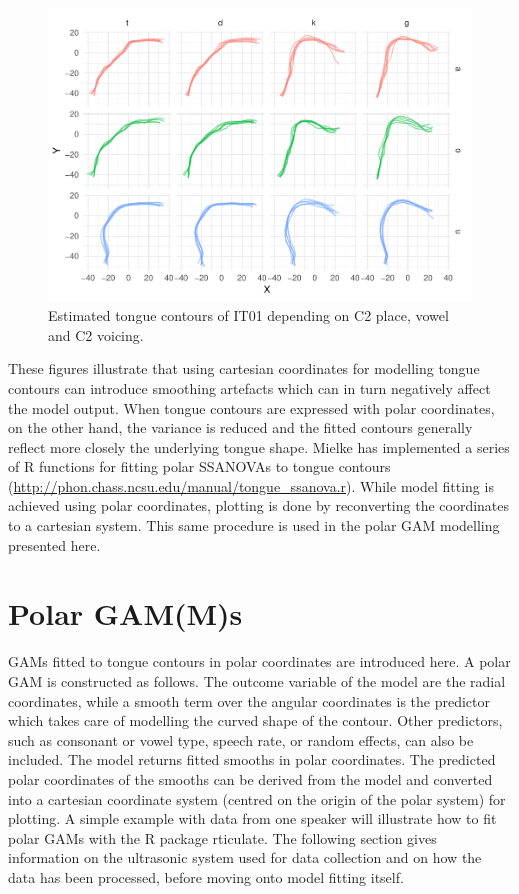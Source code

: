 \documentclass[11pt,]{article}
\begin{document}
\begin{figure}

{\centering \includegraphics[width=\linewidth]{2018-polar-gam_files/figure-latex/Figure03} 

}

\caption{Estimated tongue contours of IT01 depending on C2 place, vowel and C2 voicing.}\label{f:Figure03}
\end{figure}

These figures illustrate that using cartesian coordinates for modelling
tongue contours can introduce smoothing artefacts which can in turn
negatively affect the model output. When tongue contours are expressed
with polar coordinates, on the other hand, the variance is reduced and
the fitted contours generally reflect more closely the underlying tongue
shape. Mielke has implemented a series of R \citep{r-core-team2018}
functions for fitting polar SSANOVAs to tongue contours
(\url{http://phon.chass.ncsu.edu/manual/tongue_ssanova.r}). While model
fitting is achieved using polar coordinates, plotting is done by
reconverting the coordinates to a cartesian system. This same procedure
is used in the polar GAM modelling presented here.

\hypertarget{polar-gamms}{%
\section{Polar GAM(M)s}\label{polar-gamms}}

GAMs fitted to tongue contours in polar coordinates are introduced here.
A polar GAM is constructed as follows. The outcome variable of the model
are the radial coordinates, while a smooth term over the angular
coordinates is the predictor which takes care of modelling the curved
shape of the contour. Other predictors, such as consonant or vowel type,
speech rate, or random effects, can also be included. The model returns
fitted smooths in polar coordinates. The predicted polar coordinates of
the smooths can be derived from the model and converted into a cartesian
coordinate system (centred on the origin of the polar system) for
plotting. A simple example with data from one speaker will illustrate
how to fit polar GAMs with the R package rticulate. The following
section gives information on the ultrasonic system used for data
collection and on how the data has been processed, before moving onto
model fitting itself.
\end{document}

